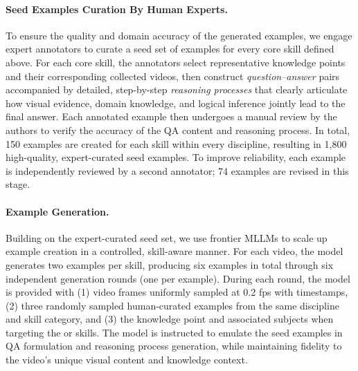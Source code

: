 \paragraph{Seed Examples Curation By Human Experts.}
To ensure the quality and domain accuracy of the generated examples, we engage expert annotators to curate a seed set of examples for every core skill defined above.
For each core skill, the annotators select representative knowledge points and their corresponding collected videos, then construct \emph{question–answer} pairs accompanied by detailed, step-by-step \emph{reasoning processes} that clearly articulate how visual evidence, domain knowledge, and logical inference jointly lead to the final answer.
Each annotated example then undergoes a manual review by the authors to verify the accuracy of the QA content and reasoning process. 
In total, 150 examples are created for each skill within every discipline, resulting in 1,800 high-quality, expert-curated seed examples. 
To improve reliability, each example is independently reviewed by a second annotator;
74 examples are revised in this stage.

\vspace{-8pt}
\paragraph{Example Generation.}
Building on the expert-curated seed set, we use frontier MLLMs to scale up example creation in a controlled, skill-aware manner.
For each video, the model generates two examples per skill, producing six examples in total through six independent generation rounds (one per example).
During each round, the model is provided with (1) video frames uniformly sampled at 0.2 fps with timestamps, (2) three randomly sampled human-curated examples from the same discipline and skill category, and (3) the knowledge point and associated subjects when targeting the \kv or \kvr skills. 
The model is instructed to emulate the seed examples in QA formulation and reasoning process generation, while maintaining fidelity to the video’s unique visual content and knowledge context.





\vspace{-8pt}
